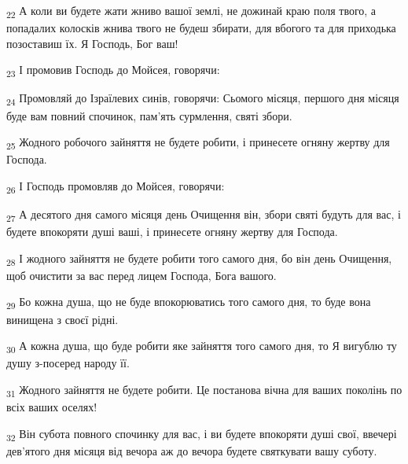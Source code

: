 \begin{tcolorbox}
\textsubscript{22} А коли ви будете жати жниво вашої землі, не дожинай краю поля твого, а попадалих колосків жнива твого не будеш збирати, для вбогого та для приходька позоставиш їх. Я Господь, Бог ваш!
\end{tcolorbox}
\begin{tcolorbox}
\textsubscript{23} І промовив Господь до Мойсея, говорячи:
\end{tcolorbox}
\begin{tcolorbox}
\textsubscript{24} Промовляй до Ізраїлевих синів, говорячи: Сьомого місяця, першого дня місяця буде вам повний спочинок, пам'ять сурмлення, святі збори.
\end{tcolorbox}
\begin{tcolorbox}
\textsubscript{25} Жодного робочого зайняття не будете робити, і принесете огняну жертву для Господа.
\end{tcolorbox}
\begin{tcolorbox}
\textsubscript{26} І Господь промовляв до Мойсея, говорячи:
\end{tcolorbox}
\begin{tcolorbox}
\textsubscript{27} А десятого дня самого місяця день Очищення він, збори святі будуть для вас, і будете впокоряти душі ваші, і принесете огняну жертву для Господа.
\end{tcolorbox}
\begin{tcolorbox}
\textsubscript{28} І жодного зайняття не будете робити того самого дня, бо він день Очищення, щоб очистити за вас перед лицем Господа, Бога вашого.
\end{tcolorbox}
\begin{tcolorbox}
\textsubscript{29} Бо кожна душа, що не буде впокорюватись того самого дня, то буде вона винищена з своєї рідні.
\end{tcolorbox}
\begin{tcolorbox}
\textsubscript{30} А кожна душа, що буде робити яке зайняття того самого дня, то Я вигублю ту душу з-посеред народу її.
\end{tcolorbox}
\begin{tcolorbox}
\textsubscript{31} Жодного зайняття не будете робити. Це постанова вічна для ваших поколінь по всіх ваших оселях!
\end{tcolorbox}
\begin{tcolorbox}
\textsubscript{32} Він субота повного спочинку для вас, і ви будете впокоряти душі свої, ввечері дев'ятого дня місяця від вечора аж до вечора будете святкувати вашу суботу.
\end{tcolorbox}
